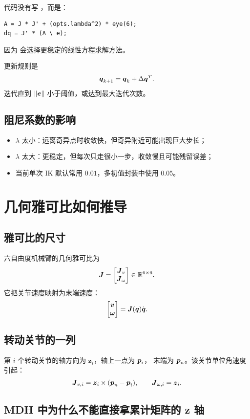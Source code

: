 代码没有写 ，而是：
\begin{lstlisting}
A = J * J' + (opts.lambda^2) * eye(6);
dq = J' * (A \ e);
\end{lstlisting}
因为  会选择更稳定的线性方程求解方法。

更新规则是
\[
\boldsymbol{q}_{k+1}=\boldsymbol{q}_k+\Delta\boldsymbol{q}^T.
\]
迭代直到 $\left\lVert \boldsymbol{e}\right\rVert$ 小于阈值，或达到最大迭代次数。

\subsection{阻尼系数的影响}

\begin{itemize}
  \item $\lambda$ 太小：远离奇异点时收敛快，但奇异附近可能出现巨大步长；
  \item $\lambda$ 太大：更稳定，但每次只走很小一步，收敛慢且可能残留误差；
  \item 当前单次 IK 默认常用 $0.01$，多初值封装中使用 $0.05$。
\end{itemize}

\section{几何雅可比如何推导}

\subsection{雅可比的尺寸}

六自由度机械臂的几何雅可比为
\[
\boldsymbol{J}=
\begin{bmatrix}
\boldsymbol{J}_v\\
\boldsymbol{J}_\omega
\end{bmatrix}\in\mathbb{R}^{6\times6}.
\]
它把关节速度映射为末端速度：
\[
\begin{bmatrix}\boldsymbol{v}\\\boldsymbol{\omega}\end{bmatrix}
=\boldsymbol{J}(\boldsymbol{q})\dot{\boldsymbol{q}}.
\]

\subsection{转动关节的一列}

第 $i$ 个转动关节的轴方向为 $\boldsymbol{z}_i$，轴上一点为 $\boldsymbol{p}_i$，
末端为 $\boldsymbol{p}_n$。该关节单位角速度引起：
\[
\boldsymbol{J}_{v,i}=\boldsymbol{z}_i\times(\boldsymbol{p}_n-\boldsymbol{p}_i),\qquad
\boldsymbol{J}_{\omega,i}=\boldsymbol{z}_i.
\]

\subsection{MDH 中为什么不能直接拿累计矩阵的 z 轴}

